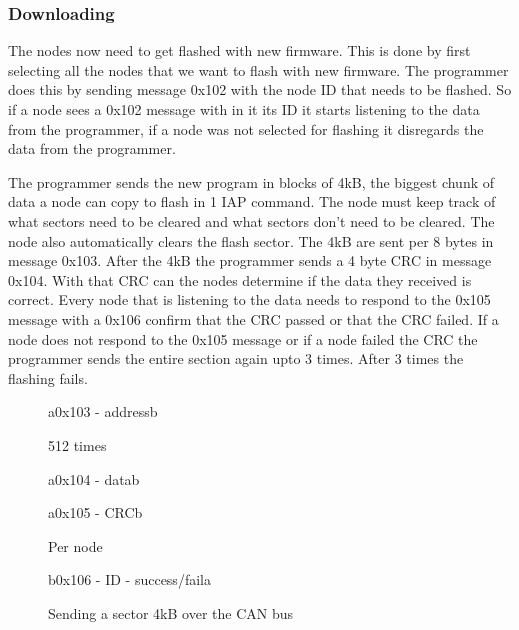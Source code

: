 \documentclass[twocolumn]{article}
\begin{document}
		\subsubsection*{Downloading}
			The nodes now need to get flashed with new firmware.
			This is done by first selecting all the nodes that we want to flash with new firmware.
			The programmer does this by sending message 0x102 with the node ID that needs to be flashed.
			So if a node sees a 0x102 message with in it its ID it starts listening to the data from the programmer,
			if a node was not selected for flashing it disregards the data from the programmer.
			
			The programmer sends the new program in blocks of 4kB,
			the biggest chunk of data a node can copy to flash in 1 IAP command.
			The node must keep track of what sectors need to be cleared and what sectors don't need to be cleared.
			The node also automatically clears the flash sector.
			The 4kB are sent per 8 bytes in message 0x103.
			After the 4kB the programmer sends a 4 byte CRC in message 0x104.
			With that CRC can the nodes determine if the data they received is correct.
			Every node that is listening to the data needs to respond to the 0x105 message with a 0x106 confirm that the CRC passed or that the CRC failed.
			If a node does not respond to the 0x105 message or if a node failed the CRC the programmer sends the entire section again upto 3 times.
			After 3 times the flashing fails.
			
			
		
			\begin{figure}[t]
				\centering
				\begin{sequencediagram}
					
					\begin{call}{a}{0x103 - address}{b}{} %
					\end{call}
					\begin{sdloop}{512 times}
						\begin{call}{a}{0x104 - data}{b}{} %
						\end{call}
					\end{sdloop}
					\begin{call}{a}{0x105 - CRC}{b}{} %
						\begin{sdloop}{Per node}
							\begin{call}{b}{0x106 - ID - success/fail}{a}{} %
							\end{call}
						\end{sdloop}
					\end{call}
				
				\end{sequencediagram}
				\caption{Sending a sector 4kB over the CAN bus}
			\end{figure}
		
\end{document}

